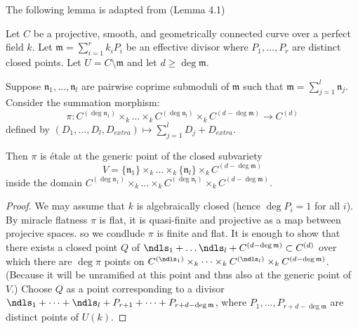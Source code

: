 The following lemma is adapted from \cite{takeuchi2018blow} (Lemma 4.1)
\begin{lemma}\label{lemma:takeuchi_lemma}
     Let $C$ be a projective, smooth, and geometrically connected curve over a perfect field $k$. 
     Let $\mathfrak{m} = \sum_{i=1}^{r} k_i P_i$ be an effective divisor where $P_1, \dots, P_r$ are distinct closed points. 
     Let $U = C \setminus \mathfrak{m}$ and let $d \geq \deg \mathfrak{m}$.

     Suppose $\mathfrak{n}_1, \dots, \mathfrak{n}_l$ are pairwise coprime submoduli of $\mathfrak{m}$ such that $\mathfrak{m} = \sum_{j=1}^l \mathfrak{n}_j$. 
     Consider the summation morphism:
     \[
     \pi : C^{(\deg \mathfrak{n}_1)} \times_k \dots \times_k C^{(\deg \mathfrak{n}_l)} \times_k C^{(d - \deg \mathfrak{m})} \longrightarrow C^{(d)}
     \]
     defined by $(D_1, \dots, D_l, D_{extra}) \mapsto \sum_{j=1}^l D_j + D_{extra}$.

     Then $\pi$ is étale at the generic point of the closed subvariety 
     \[
     V = \{\mathfrak{n}_1\} \times_k \dots \times_k \{\mathfrak{n}_l\} \times_k C^{(d - \deg \mathfrak{m})}
     \]
     inside the domain $C^{(\deg \mathfrak{n}_1)} \times_k \dots \times_k C^{(\deg \mathfrak{n}_l)} \times_k C^{(d - \deg \mathfrak{m})}$.

\begin{proof}
     We may assume that $k$ is algebraically closed (hence $\deg P_i = 1$ for all $i$). By miracle flatness $\pi$ is flat, it is quasi-finite and projective as a map between projecive spaces.
     so we condlude $\pi$ is finite and flat. 
     It is enough to show that there exists a closed point $Q$ of $\ndls_1 + \dots \ndls_l + C^{(d - \deg \mathfrak{m})} \subset C^{(d)}$ 
     over which there are $\deg \pi$ points on $C^{(\ndls_1)} \times_k \dots \times_k C^{(\ndls_l)} \times_k C^{(d - \deg \mathfrak{m})}$. (Because it will be unramified 
     at this point and thus also at the generic point of $V$.)
     Choose $Q$ as a point corresponding to a divisor
     $\ndls_1 + \dots + \ndls_l + P_{r+1} + \dots + P_{r+d - \deg \mathfrak{m}}$, where $P_1, \dots, P_{r+d - \deg \mathfrak{m}}$ are distinct points of $U(k)$.
\end{proof}     
\end{lemma}

